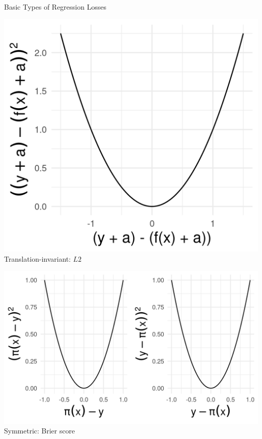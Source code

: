 \begin{vbframe}{Basic Types of Regression Losses}
\begin{minipage}[b]{0.2\textwidth}
  \includegraphics[width=\textwidth]{figure/loss_transl_inv.png}
  \tiny \centering
  Translation-invariant: $L2$
\end{minipage}%
\begin{minipage}[b]{0.3\textwidth}
  \includegraphics[width=\textwidth]{figure/loss_symmetric}
  \tiny \centering
  Symmetric: Brier score
\end{minipage}

\end{vbframe}


